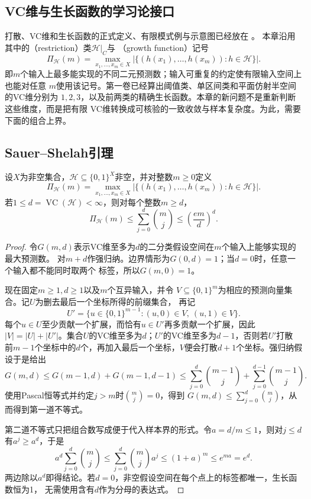 \subsection{VC维与生长函数的学习论接口}
\label{sec:binary-shattering-vc}

打散、VC维和生长函数的正式定义、有限模式例与示意图已经放在
。
本章沿用其中的（restriction）类$\mathcal H|_C$与
（growth function）记号
\begin{equation}
 \Pi_{\mathcal H}(m)
 =\max_{x_1,\ldots,x_m\in X}
   \left|\{(h(x_1),\ldots,h(x_m)):h\in\mathcal H\}\right|.
 \label{eq:learning-growth-function}
\end{equation}
即$m$个输入上最多能实现的不同二元预测数；输入可重复的约定使有限输入空间上也能对任意
$m$使用该记号。第一卷已经算出阈值类、单区间类和平面仿射半空间的VC维分别为
$1,2,3$，以及前两类的精确生长函数。本章的新问题不是重新判断这些维度，而是把有限
VC维转换成可核验的一致收敛与样本复杂度。为此，需要下面的组合上界。

\subsection{Sauer--Shelah引理}
\label{sec:binary-growth-sauer}

\begin{lemma}
\label{lem:learning-sauer-shelah}
设$X$为非空集合，$\mathcal H\subseteq\{0,1\}^X$非空，并对整数$m\geq0$定义
\[
 \Pi_{\mathcal H}(m)
 =\max_{x_1,\ldots,x_m\in X}
 \left|\{(h(x_1),\ldots,h(x_m)):h\in\mathcal H\}\right|.
\]
若$1\leq d=\operatorname{VC}(\mathcal H)<\infty$，则对每个整数$m\geq d$，
\begin{equation}
 \Pi_{\mathcal H}(m)
 \leq\sum_{j=0}^{d}\binom{m}{j}
 \leq\left(\frac{em}{d}\right)^d.
 \label{eq:learning-sauer-shelah}
\end{equation}
\end{lemma}
\begin{proof}
令$G(m,d)$表示VC维至多为$d$的二分类假设空间在$m$个输入上能够实现的最大预测数。
对$m+d$作强归纳。边界情形为$G(0,d)=1$；当$d=0$时，任意一个输入都不能同时取两个
标签，所以$G(m,0)=1$。

现在固定$m\geq1,d\geq1$以及$m$个互异输入，并令
$V\subseteq\{0,1\}^{m}$为相应的预测向量集合。记$U$为删去最后一个坐标所得的前缀集合，
再记
\[
 U'=\{u\in\{0,1\}^{m-1}:(u,0)\in V,\ (u,1)\in V\}.
\]
每个$u\in U$至少贡献一个扩展，而恰有$u\in U'$再多贡献一个扩展，因此
$|V|=|U|+|U'|$。集合$U$的VC维至多为$d$；$U'$的VC维至多为$d-1$，否则若$U'$打散
前$m-1$个坐标中的$d$个，再加入最后一个坐标，$V$便会打散$d+1$个坐标。强归纳假设于是给出
\[
 G(m,d)\leq G(m-1,d)+G(m-1,d-1)
 \leq\sum_{j=0}^{d}\binom{m-1}{j}
   +\sum_{j=0}^{d-1}\binom{m-1}{j}.
\]
使用Pascal恒等式并约定$j>m$时$\binom mj=0$，得到
$G(m,d)\leq\sum_{j=0}^{d}\binom mj$，从而得到第一道不等式。

第二道不等式只把组合数写成便于代入样本界的形式。令$a=d/m\leq1$，则对$j\leq d$
有$a^j\geq a^d$，于是
\[
 a^d\sum_{j=0}^d\binom mj
 \leq\sum_{j=0}^d\binom mj a^j
 \leq(1+a)^m\leq e^{ma}=e^d.
\]
两边除以$a^d$即得结论。若$d=0$，非空假设空间在每个点上的标签都唯一，生长函数恒为1，
无需使用含有$d$作为分母的表达式。
\end{proof}

